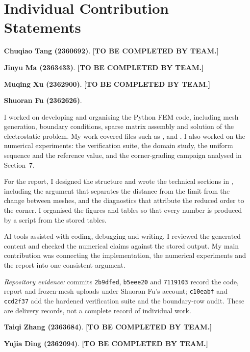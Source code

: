 \documentclass[11pt]{article}
\newcommand{\todo}[1]{\textcolor{red!70!black}{\textbf{[#1]}}}
\begin{document}
\clearpage
\section{Individual Contribution Statements}

\begin{description}[style=nextline,leftmargin=0pt,labelwidth=0pt]
\item[Member 1:] \textbf{Chuqiao Tang (2360692)}. \todo{TO BE COMPLETED BY TEAM.}
\item[Member 2:] \textbf{Jinyu Ma (2363433)}. \todo{TO BE COMPLETED BY TEAM.}
\item[Member 3:] \textbf{Muqing Xu (2362900)}. \todo{TO BE COMPLETED BY TEAM.}

\item[Member 4:] \textbf{Shuoran Fu (2362626)}.

I worked on developing and organising the Python FEM code, including mesh generation,
boundary conditions, sparse matrix assembly and solution of the electrostatic problem. My
work covered files such as ,  and
. I also worked on the numerical experiments: the verification suite,
the domain study, the uniform sequence and the reference value, and the corner-grading
campaign analysed in Section~7.

For the report, I designed the structure and wrote the technical sections in
, including the argument that separates the distance from the limit
from the change between meshes, and the diagnostics that attribute the reduced order to the
corner. I organised the figures and tables so that every number is produced by a script
from the stored tables.

AI tools assisted with coding, debugging and writing. I reviewed the generated content and
checked the numerical claims against the stored output. My main contribution was connecting
the implementation, the numerical experiments and the report into one consistent argument.

\noindent\textit{Repository evidence:} commits \texttt{2b9dfed}, \texttt{b5eee20} and
\texttt{7119103} record the code, report and frozen-mesh uploads under Shuoran Fu's account;
\texttt{c10eabf} and \texttt{ccd2f37} add the hardened verification suite and the
boundary-row audit. These are delivery records, not a complete record of individual work.

\item[Member 5:] \textbf{Taiqi Zhang (2363684)}. \todo{TO BE COMPLETED BY TEAM.}
\item[Member 6:] \textbf{Yujia Ding (2362094)}. \todo{TO BE COMPLETED BY TEAM.}
\end{description}
\end{document}
